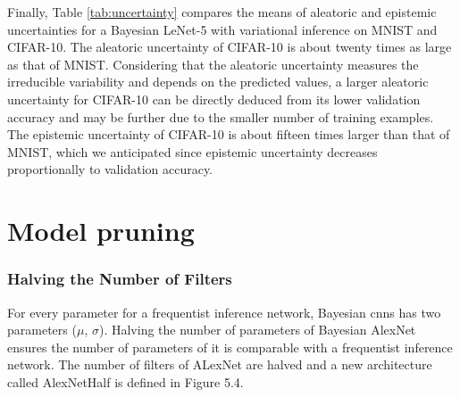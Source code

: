 \newline Finally, Table \ref{tab:uncertainty} compares the means of aleatoric and epistemic uncertainties for a Bayesian LeNet-5 with variational inference on MNIST and CIFAR-10. The aleatoric uncertainty of CIFAR-10 is about twenty times as large as that of MNIST. Considering that the aleatoric uncertainty measures the irreducible variability and depends on the predicted values, a larger aleatoric uncertainty for CIFAR-10 can be directly deduced from its lower validation accuracy and may be further due to the smaller number of training examples. The epistemic uncertainty of CIFAR-10 is about fifteen times larger than that of MNIST, which we anticipated since epistemic uncertainty decreases proportionally to validation accuracy. 
\begin{table}[H]
\tiny
    \centering
    \renewcommand{\arraystretch}{1.5}
    \renewcommand{\arraystretch}{1.5}
    \caption{Aleatoric and epistemic uncertainty for Bayesian LeNet-5 calculated for MNIST and CIFAR-10, computed as proposed by Kwon et al. \cite{kwon2018uncertainty}.}
    \label{tab:uncertainty}
\end{table}

\section{Model pruning}

\subsubsection{Halving the Number of Filters}

For every parameter for a frequentist inference network, Bayesian \acp{cnn} has two parameters ($\mu$, $\sigma$). Halving the number of parameters of Bayesian AlexNet ensures the number of parameters of it is comparable with a frequentist inference network. The number of filters of ALexNet are halved and a new architecture called AlexNetHalf is defined in Figure 5.4. 

